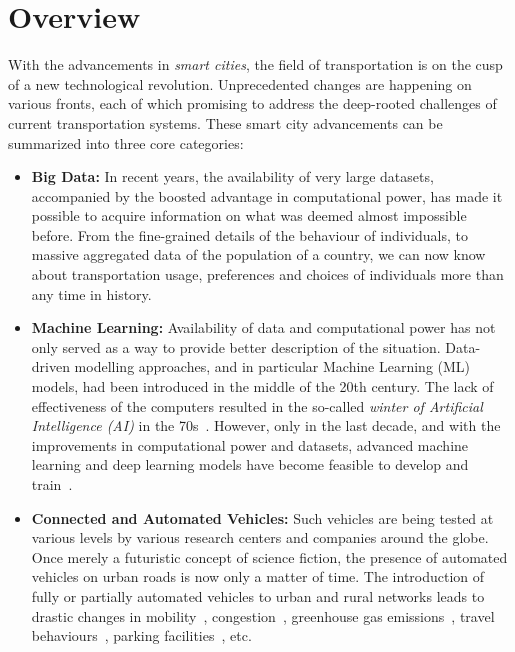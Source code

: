 \chapter{Overview}\label{ch:over}
With the advancements in \emph{smart cities}, the field of transportation is on the cusp of a new technological revolution. Unprecedented changes are happening on various fronts, each of which promising to address the deep-rooted challenges of current transportation systems. These smart city advancements can be summarized into three core categories:
\begin{itemize}
    \item \textbf{Big Data:} In recent years, the availability of very large datasets, accompanied by the boosted advantage in computational power, has made it possible to acquire information on what was deemed almost impossible before. From the fine-grained details of the behaviour of individuals, to massive aggregated data of the population of a country, we can now know about transportation usage, preferences and choices of individuals more than any time in history.
    \item\textbf{\textbf{Machine Learning:}} Availability of data and computational power has not only served as a way to provide better description of the situation. Data-driven modelling approaches, and in particular Machine Learning (ML) models, had been introduced in the middle of the 20th century. The lack of effectiveness of the computers resulted in the so-called \textit{winter of Artificial Intelligence (AI)} in the 70s~\cite{russell2002artificial}. However, only in the last decade, and with the improvements in computational power and datasets, advanced machine learning and deep learning models have become feasible to develop and train~\cite{Goodfellow-et-al-2016}.
    \item\textbf{Connected and Automated Vehicles:} Such vehicles are being tested at various levels by various research centers and companies around the globe. Once merely a futuristic concept of science fiction, the presence of automated vehicles on urban roads is now only a matter of time. The introduction of fully or partially automated vehicles to urban and rural networks leads to drastic changes in mobility~\cite{angerholzer2017autonomous}, congestion~\cite{djavadian2020multi}, greenhouse gas emissions~\cite{greenblatt2015autonomous}, travel behaviours~\cite{farooq2018virtual}, parking facilities~\cite{bahrami2019impacts}, etc. 
\end{itemize}
